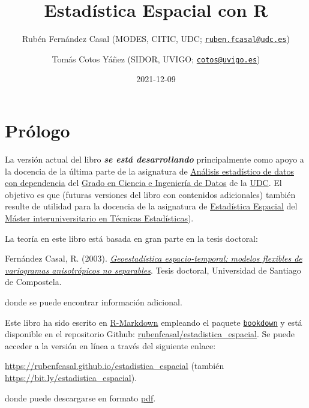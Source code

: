 \documentclass[
  spanish,
]{book}
\title{Estadística Espacial con R}
\author{Rubén Fernández Casal (MODES, CITIC, UDC; \href{mailto:ruben.fcasal@udc.es}{\nolinkurl{ruben.fcasal@udc.es}}) \and Tomás Cotos Yáñez (SIDOR, UVIGO; \href{mailto:cotos@uvigo.es}{\nolinkurl{cotos@uvigo.es}})}
\date{2021-12-09}
\theoremstyle{break}
\theoremstyle{definition}
\theoremstyle{definition}
\theoremstyle{definition}
\theoremstyle{definition}
\theoremstyle{remark}
\begin{document}
\maketitle

{
\setcounter{tocdepth}{1}
\tableofcontents
}
\hypertarget{pruxf3logo}{%
\chapter*{Prólogo}\label{pruxf3logo}}

La versión actual del libro \textbf{\emph{se está desarrollando}} principalmente como apoyo a la docencia de la última parte de la asignatura de \href{https://guiadocente.udc.es/guia_docent/index.php?centre=614\&ensenyament=614G02\&assignatura=614G02022\&idioma=cast}{Análisis estadístico de datos con dependencia} del \href{https://estudos.udc.es/es/study/start/614G02V01}{Grado en Ciencia e Ingeniería de Datos} de la \href{https://www.udc.es}{UDC}.
El objetivo es que (futuras versiones del libro con contenidos adicionales) también resulte de utilidad para la docencia de la asignatura de \href{http://eamo.usc.es/pub/mte/index.php?option=com_content\&view=article\&id=2202\&idm=15\&a\%C3\%B1o=2021}{Estadística Espacial} del \href{http://eio.usc.es/pub/mte}{Máster interuniversitario en Técnicas Estadísticas}).

La teoría en este libro está basada en gran parte en la tesis doctoral:

Fernández Casal, R. (2003). \href{https://rubenfcasal.github.io/files/Geoestadistica_espacio-temporal.pdf}{\emph{Geoestadística espacio-temporal: modelos flexibles de variogramas anisotrópicos no separables}}. Tesis doctoral, Universidad de Santiago de Compostela.

donde se puede encontrar información adicional.

Este libro ha sido escrito en \href{http://rmarkdown.rstudio.com}{R-Markdown} empleando el paquete \href{https://bookdown.org/yihui/bookdown/}{\texttt{bookdown}} y está disponible en el repositorio Github: \href{https://github.com/rubenfcasal/estadistica_espacial}{rubenfcasal/estadistica\_espacial}.
Se puede acceder a la versión en línea a través del siguiente enlace:

\url{https://rubenfcasal.github.io/estadistica_espacial} (también \url{https://bit.ly/estadistica_espacial}).

donde puede descargarse en formato \href{https://rubenfcasal.github.io/estadistica_espacial/estadistica_espacial.pdf}{pdf}.
\end{document}
